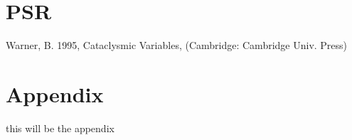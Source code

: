 \documentclass[oneside,a4paper,11pt]{report}
\begin{document}
\section{PSR}







\begin{thebibliography}{99}
 Warner, B. 1995, Cataclysmic Variables, (Cambridge: Cambridge Univ. Press)


\end{thebibliography}


\appendix
\section*{Appendix}
this will be the appendix
\end{document}
